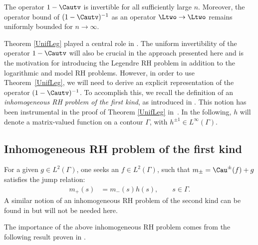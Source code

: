 \begin{Theorem}[{\cite[Theorem 4.5]{CD}}]\label{UnifLeg}
The operator $1-\Cautv$ is invertible for all sufficiently large $n$. Moreover, the operator bound of $(1-\Cautv)^{-1}$ as an operator $\Ltwo \to \Ltwo$ remains uniformly bounded for $n \to \infty$.
\end{Theorem}
Theorem \ref{UnifLeg} played a central role in \cite{CD}. The uniform invertibility of the operator $1-\Cautv$ will also be crucial in the approach presented here and is the motivation for introducing the Legendre RH problem in addition to the logarithmic and model RH problems. However, in order to use Theorem~\ref{UnifLeg}, we will need to derive an explicit representation of the operator $(1-\Cautv)^{-1}$. To accomplish this, we recall the definition of an \emph{inhomogeneous RH problem of the first kind}, as introduced in \cite[Section~2.6]{DZSob}. This notion has been instrumental in the proof of Theorem \ref{UnifLeg} in~\cite{CD}. In the following, $h$ will denote a matrix-valued function on a contour $\Gamma$, with $h^{\pm 1} \in L^\infty(\Gamma)$.

\subsection*{Inhomogeneous RH problem of the first kind} For a given $g \in L^2(\Gamma)$, one seeks an $f \in L^2(\Gamma)$, such that $m_\pm = \Cau^\pm(f)+g$ satisfies the jump relation:
\begin{align}\label{HJump}
 m_+(s) &= m_-(s) h(s), \qquad s \in \Gamma.
\end{align}
A similar notion of an inhomogeneous RH problem of the second kind can be found in \cite[Section~2]{DZSob} but will not be needed here.

The importance of the above inhomogeneous RH problem comes from the following result proven in \cite[Proposition~2.6]{DZSob}.

